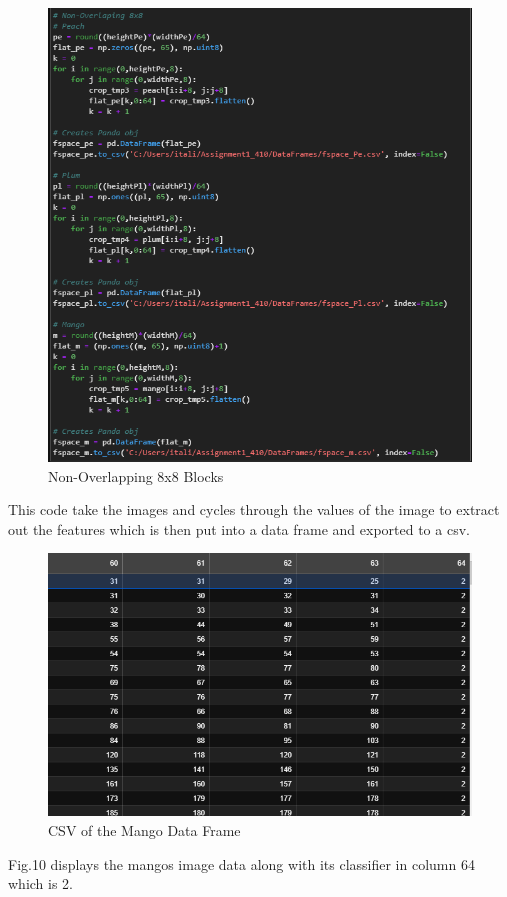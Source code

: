 \documentclass[conference]{IEEEtran}
\begin{document}
\begin{figure}[h]
  \centering
  \includegraphics[width=\linewidth]{8x8NO.png}
  \caption{Non-Overlapping 8x8 Blocks}
\end{figure}

This code take the images and cycles through the values of the image to extract out the features which is then put into a data frame and exported to a csv.

\begin{figure}[h]
  \centering
  \includegraphics[width=\linewidth]{mango_dataframe.png}
  \caption{CSV of the Mango Data Frame}
\end{figure}
Fig.10 displays the mangos image data along with its classifier in column 64 which is 2.
\end{document}
